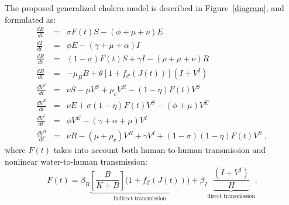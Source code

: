 The proposed generalized cholera model is described in Figure~\ref{diagram}, and formulated as:
\begin{eqnarray} \label{eq:fullmodel}
 \frac{dE}{dt} &=& \sigma F(t) S - (\phi + \mu +\nu) E \label{eq:E2}\\
 \frac{dI}{dt} &=& \phi E - (\gamma + \mu + \alpha) I \label{eq:I2}\\
 \frac{dR}{dt} &=& (1-\sigma) F(t) S + \gamma I - (\rho + \mu+\nu) R \label{eq:R2}\\
 \frac{dB}{dt} &=& - \mu_B B +\theta\left[1 + f_{\mathcal{C}}\left( J(t)\right) \right] (I+V^I) \label{eq:B2}\\
\frac{dV^S}{dt} &=& \nu S - \mu V^S+ \rho_{v} V^R - (1-\eta) F(t) V^S \label{eq:VS2}\\
 \frac{dV^E}{dt} &=& \nu E + \sigma (1-\eta) F(t) V^S-(\phi + \mu) V^E \label{eq:VE2}\\
 \frac{dV^I}{dt} &=&  \phi V^E -(\gamma + \alpha + \mu) V^I \label{eq:VI2}\\
 \frac{dV^R}{dt} &=& \nu R -(\mu +\rho_{v})V^R +\gamma V^I +(1-\sigma) (1-\eta) F(t) V^S\label{eq:VR2}\; ,
\end{eqnarray}
where $F(t)$ takes into account both human-to-human transmission and nonlinear water-to-human transmission:
\begin{equation}
  F(t) = \beta_B \underbrace{ \left[\frac{B}{K + B} \right] \bigg(1+f_{\mathcal{E}}\left(J(t)\right)\bigg)}_{\text{indirect transmission}} + \beta_{I} \underbrace{\frac{(I+V^I)}{H}}_{\text{direct transmission}}.
\label{eq:force2}
\end{equation}

